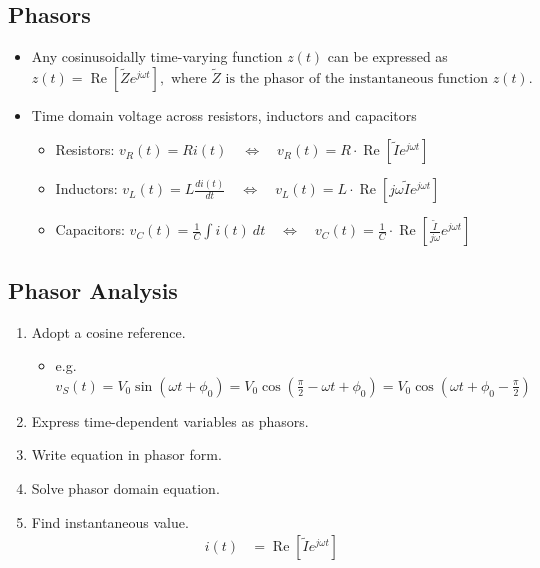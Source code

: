 \documentclass[a4paper]{article}
\begin{document}
\subsection{Phasors}
\begin{itemize}
    \item Any cosinusoidally time-varying function $z(t)$ can be expressed as 
    $$z(t)=\operatorname{Re}\left[\widetilde{Z}e^{j\omega t}\right],\text{ where }\widetilde{Z}\text{ is the phasor of the instantaneous function }z(t).$$
    \item Time domain voltage across resistors, inductors and capacitors
    \begin{itemize}[label=$\circ$]
        \item Resistors: $v_{R}(t) = Ri(t)\quad \Leftrightarrow \quad v_{R}(t) = R\cdot\operatorname{Re}\left[\widetilde{I}e^{j\omega t}\right]$
        \item Inductors: $v_{L}(t) = L\displaystyle\frac{di(t)}{dt}\quad \Leftrightarrow \quad v_{L}(t) = L\cdot\operatorname{Re}\left[j\omega\widetilde{I}e^{j\omega t}\right]$
        \item Capacitors: $v_{C}(t) = \displaystyle\frac{1}{C}\int i(t)\ dt\quad \Leftrightarrow \quad v_{C}(t) = \frac{1}{C}\cdot\operatorname{Re}\left[\displaystyle\frac{\widetilde{I}}{j\omega}e^{j\omega t}\right]$
    \end{itemize}
\end{itemize}

\newpage
\subsection{Phasor Analysis}
\begin{enumerate}
    \item Adopt a cosine reference.
    \begin{itemize}[label=$\circ$]
        \item e.g. $v_{S}(t) = V_{0}\sin\left(\omega t+\phi_{0}\right)= V_{0}\cos\left(\displaystyle\frac{\pi}{2}-\omega t+\phi_{0}\right)= V_{0}\cos\left(\omega t+\phi_{0}-\displaystyle\frac{\pi}{2}\right)$
    \end{itemize}
    \item Express time-dependent variables as phasors.
    \item Write equation in phasor form.
    \item Solve phasor domain equation.
    \item Find instantaneous value.
    \begin{align*}
        i(t) &= \operatorname{Re}\left[\widetilde{I}e^{j\omega t}\right]
    \end{align*}
\end{enumerate}
\end{document}
